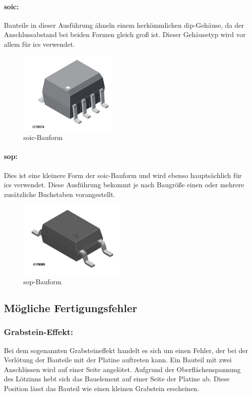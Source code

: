 \paragraph{\ac{soic}:}
Bauteile in dieser Ausführung ähneln einem herkömmlichen \ac{dip}-Gehäuse, da der Anschlussabstand bei beiden Formen gleich groß ist. Dieser Gehäusetyp wird vor allem für \acp{ic} verwendet.
\begin{figure}[H]
	\centering
	\includegraphics{images/technische_grundlagen/soic.png}
	\caption{\ac{soic}-Bauform \cite[vgl.][]{vishay-soic}}
\end{figure}

\paragraph{\ac{sop}:}
Dies ist eine kleinere Form der \ac{soic}-Bauform und wird ebenso hauptsächlich für \acp{ic} verwendet. Diese Ausführung bekommt je nach Baugröße einen oder mehrere zusätzliche Buchstaben vorangestellt.
\begin{figure}[H]
	\centering
	\includegraphics{images/technische_grundlagen/sop.png}
	\caption{\ac{sop}-Bauform \cite[vgl.][]{vishay-sop}}
\end{figure}

\subsection{Mögliche Fertigungsfehler}
\subsubsection{Grabstein-Effekt:} %
Bei dem sogenannten Grabsteineffekt handelt es sich um einen Fehler, der bei der Verlötung der Bauteile mit der Platine auftreten kann.
Ein Bauteil mit zwei Anschlüssen wird auf einer Seite angelötet.
Aufgrund der Oberflächenspannung des Lötzinns hebt sich das Bauelement auf einer Seite der Platine ab.
Diese Position lässt das Bauteil wie einen kleinen Grabstein erscheinen.\par


